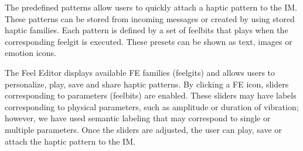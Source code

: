 %

The predefined patterns allow users to quickly attach a haptic pattern to the IM. These patterns can be stored from incoming messages or created by using stored haptic families. Each pattern is defined by a set of feelbits that plays when the corresponding feelgit is executed. These presets can be shown as text, images or emotion icons.

The Feel Editor displays available FE families (feelgits) and allows users to personalize, play, save and share haptic patterns.
By clicking a FE icon, sliders corresponding to parameters (feelbits) are enabled. These sliders may have labels corresponding to physical parameters, such as amplitude or duration of vibration; however, we have used semantic labeling that may correspond to single or multiple parameters. Once the sliders are adjusted, the user can play, save or attach the haptic pattern to the IM.


%


